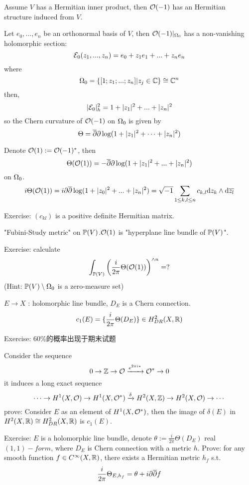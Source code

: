 Assume $V$ has a Hermitian inner product, then $\mathcal{O}(-1)$ has an
Hermitian structure induced from $V$.

Let $e_0,...,e_n$ be an orthonormal basis of $V$, then
$\mathcal{O}(-1)|_{\Omega_0}$ has a non-vanishing holomorphic section:
$$\mathcal{E}_0(z_1,...,z_n)=e_0+z_1e_1+...+z_ne_n$$
where
$$\Omega_0=\{[1;z_1;...;z_n]|z_j\in\mathbb{C}\}\cong\mathbb{C}^n$$
then,
$$|\mathcal{E}_0|^2_h=1+|z_1|^2+...+|z_n|^2$$
so the Chern curvature of $\mathcal{O}(-1)$ on $\Omega_0$ is given by
$$\Theta=\overline{\partial}\partial\log(1+|z_1|^2+\cdots+|z_n|^2)$$

Denote $\mathcal{O}(1):=\mathcal{O}(-1)^*$, then
$$\Theta(\mathcal{O}(1))=-\overline{\partial}\partial\log(1+|z_1|^2+...+|z_n|^2)$$
on $\Omega_0$.
$$i\Theta(\mathcal{O}(1))=i\partial\overline{\partial}\log(1+|z_0|^2+...+|z_n|^2)
=\sqrt{-1}\sum_{1\leq k,l\leq n}
c_{k,l}\mathrm{d} z_k\wedge\mathrm{d}\overline{z_l}$$

Exercise: $(c_{kl})$ is a positive definite Hermitian matrix.

"Fubini-Study metric" on $\mathbb{P}(V)$.$\mathcal{O}(1)$ is
"hyperplane line bundle of $\mathbb{P}(V)$".

Exercise: calculate
$$\int_{\mathbb{P}(V)}
    \left(
      \frac{i}{2\pi}
      \Theta(\mathcal{O}(1))
    \right)^{\wedge n}
=?
$$
(Hint: $\mathbb{P}(V)\setminus\Omega_0$ is a zero-measure set)

$E\to X$ : holomorphic line bundle, $D_E$ is a Chern connection.
$$c_1(E)=\{\frac{i}{2\pi}\Theta(D_E)\}\in H_{DR}^2(X,\mathbb{R})$$

Exercise:
{\color{red} $60\%$的概率出现于期末试题}

Consider the sequence
$$0\to\mathbb{Z}\to\mathcal{O}\xrightarrow{e^{2\pi i *}}\mathcal{O}^*\to 0$$
it induces a long exact sequence
$$\cdots\to
H^1(X,\mathcal{O})\to H^1(X,\mathcal{O}^*)\xrightarrow{\delta}H^2(X,\mathbb{Z})\to H^2(X,\mathcal{O})\to\cdots
$$
prove: Consider $E$ as an element of $H^1(X,\mathcal{O}^*)$, then the
image of $\delta(E)$ in $H^2(X,\mathbb{R})\cong H^2_{DR}(X,\mathbb{R})$ is $c_1(E)$.

Exercise: $E$ is a holomorphic line bundle, denote
$\theta:=\frac{i}{2\pi}\Theta(D_E)$ real $(1,1)-form$,
where $D_E$ is Chern connection
with a metric $h$.
Prove: for any smooth function $f\in C^\infty(X,\mathbb{R})$,
there exists a Hermitian metric $h_f$ s.t.
$$\frac{i}{2\pi}\Theta_{E,h_f}=\theta+i\partial\overline{\partial} f$$


